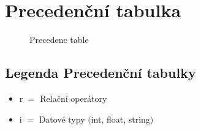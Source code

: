 \documentclass[a4paper, 11pt]{article}
\begin{document}
\begin{tabbing}
    \end{tabbing}


\newpage


\section{Precedenční tabulka}
\begin{figure}[ht]
  \centering
\caption{Precedenc table}\label{pic:2}
\end{figure}


\subsection{Legenda Precedenční tabulky}
\begin{itemize}
    \item r $=$ Relační operátory
    \item i $=$ Datové typy $($int, float, string$)$
\end{itemize}

\newpage

\end{document}
